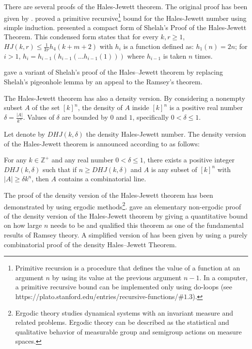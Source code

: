 There are several proofs of the Hales-Jewett theorem. The original proof has been given by \cite{hales1987regularity}. \cite{shelah1988primitive} proved a primitive recursive\footnote{Primitive recursion is a procedure that defines the value of a function at an argument $n$ by using its value at the previous argument $n-1$.  In a computer, a primitive recursive bound can be implemented only using do-loops (see https://plato.stanford.edu/entries/recursive-functions/$\#1.3$).} bound for the Hales-Jewett number using simple induction.
\cite{nilli1990shelah} presented a compact form of Shelah’s Proof of the Hales-Jewett Theorem.  This condensed form states that for every $k,r \geq 1$, $HJ(k,r) \leq \frac{1}{kr} h_4 (k+m+2)$ with $h_i$ is a function defined as: $h_1(n)=2n$; for $i>1$, $h_i=h_{i-1}(h_{i-1}(\ldots h_{i-1}(1))) $ where $h_{i-1}$  is taken  $n$ times.

 \cite{matet2007shelah} gave a variant of Shelah’s proof of the Hales–Jewett theorem by replacing Shelah’s pigeonhole lemma by an appeal to the Ramsey’s theorem.

The Hales-Jewett theorem has also a density version. By considering a nonempty subset  $A$ of the set $[k]^n$, the density of $A$ inside $[k]^n$ is a positive real number $\delta=\frac{|A|}{k^n}$. Values of $\delta$ are bounded by $0$ and $1$, specifically  $0< \delta \leq 1.$ 

Let denote by $DHJ(k, \delta)$ the density Hales-Jewett number. The density version of the Hales-Jewett theorem is announced according to \cite{polymath2012new} as follows:

\begin{thm}   For any $k \in \mathbb{Z}^+$ and any real number $0< \delta \leq 1$,  there exists a positive integer $DHJ(k, \delta)$ such that if $n \geq DHJ(k,\delta)$ and $A$ is any subset of $[k] ^n$ with $|A| \geq \delta k^n$, then $A$ contains a combinatorial line.  \label{hj2}	\end{thm}

The proof of the density version of the Hales-Jewett theorem has been demonstrated by \cite{furstenberg1991density} using ergodic methods\footnote{Ergodic theory studies dynamical systems with an invariant measure and related problems. Ergodic theory can be described as the statistical and qualitative behavior of measurable group and semigroup actions on measure spaces.}. \cite{polymath2012new} gave an elementary non-ergodic proof of the density version of the Hales-Jewett theorem by giving a quantitative bound on how large $n$ needs to be and qualified this theorem as one of the fundamental results of Ramsey theory. A simplified version of \cite{polymath2012new} has been given by \cite{dodos2013simple} using  a purely combinatorial proof of the density Hales–Jewett Theorem.

